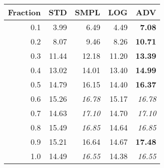 \documentclass{standalone}
\begin{document}
\begin{tabular}{r|rrrr}
      \toprule
      Fraction & STD & SMPL & LOG & ADV\\
      \midrule
      0.1 & 3.99 & 6.49 & 4.49 & \textbf{7.08}\\
  0.2 & 8.07 & 9.46 & 8.26 & \textbf{10.71}\\
  0.3 & 11.44 & 12.18 & 11.20 & \textbf{13.39}\\
  0.4 & 13.02 & 14.01 & 13.40 & \textbf{14.99}\\
  0.5 & 14.79 & 16.15 & 14.40 & \textbf{16.37}\\
  0.6 & 15.26 & \emph{16.78} & 15.17 & \emph{16.78}\\
  0.7 & 14.63 & \emph{17.10} & 14.70 & \emph{17.10}\\
  0.8 & 15.49 & \emph{16.85} & 14.64 & \emph{16.85}\\
  0.9 & 15.21 & 16.64 & 14.67 & \textbf{17.48}\\
  1.0 & 14.49 & \emph{16.55} & 14.38 & \emph{16.55}\\
  \bottomrule
\end{tabular}
\end{document}
